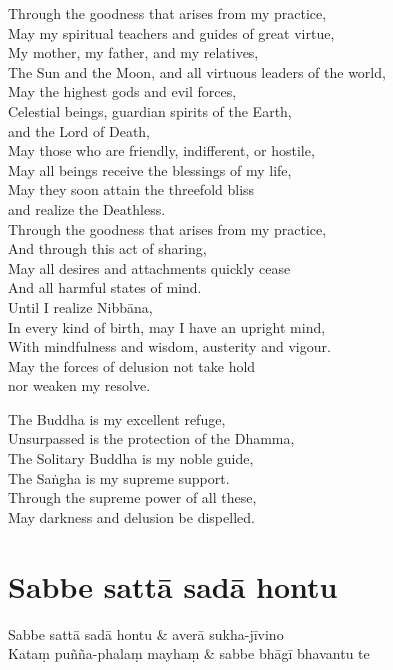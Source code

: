 Through the goodness that arises from my practice,\\
May my spiritual teachers and guides of great virtue,\\
My mother, my father, and my relatives,\\
The Sun and the Moon, and all virtuous leaders of the world,\\
May the highest gods and evil forces,\\
Celestial beings, guardian spirits of the Earth,\\\vin and the Lord of Death,\\
May those who are friendly, indifferent, or hostile,\\
May all beings receive the blessings of my life,\\
May they soon attain the threefold bliss\\\vin and realize the Deathless.\\
Through the goodness that arises from my practice,\\
And through this act of sharing,\\
May all desires and attachments quickly cease\\
And all harmful states of mind.\\
Until I realize Nibbāna,\\
In every kind of birth, may I have an upright mind,\\
With mindfulness and wisdom, austerity and vigour.\\
May the forces of delusion not take hold\\\vin nor weaken my resolve.

The Buddha is my excellent refuge,\\
Unsurpassed is the protection of the Dhamma,\\
The Solitary Buddha is my noble guide,\\
The Saṅgha is my supreme support.\\
Through the supreme power of all these,\\
May darkness and delusion be dispelled.

\section{Sabbe sattā sadā hontu}



\begin{twochants}
Sabbe sattā sadā hontu & averā sukha-jīvino\\
Kataṃ puñña-phalaṃ mayhaṃ & sabbe bhāgī bhavantu te
\end{twochants}

